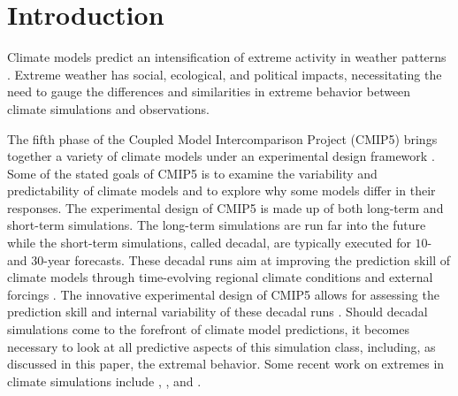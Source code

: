 \section{Introduction}
\label{intro}


Climate models predict an intensification of extreme activity in weather patterns \citep{easterling2000climate}. Extreme weather has social, ecological, and political impacts, necessitating the need to gauge the differences and similarities in extreme behavior between climate simulations and observations.



The fifth phase of the Coupled Model Intercomparison Project (CMIP5) brings together a variety of climate models under an experimental design framework \citep{taylor2012overview,hibbard2007strategy}. Some of the stated goals of CMIP5 is to examine the variability and predictability of climate models and to explore why some models differ in their responses. The experimental design of CMIP5 is made up of both long-term and short-term simulations. The long-term simulations are run far into the future while the short-term simulations, called decadal, are typically executed for $10$- and $30$-year forecasts. These decadal runs aim at improving the prediction skill of climate models through time-evolving regional climate conditions and external forcings \citep{meehl2009decadal}. The innovative experimental design of CMIP5 allows for assessing the prediction skill and internal variability of these decadal runs \citep{kim2012evaluation}. Should decadal simulations come to the forefront of climate model predictions, it becomes necessary to look at all predictive aspects of this simulation class, including, as discussed in this paper, the extremal behavior. Some recent work on extremes in climate simulations include \cite{weller2012investigation}, \cite{weller2013two}, and \cite{fix2016comparison}.

